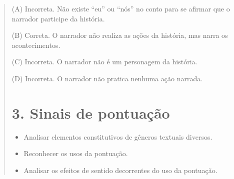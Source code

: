 \begin{quote}
(A) Incorreta. Não existe ``eu'' ou ``nós'' no conto para se afirmar
que o narrador participe da história.

(B) Correta. O narrador não realiza as ações da história, mas narra os
acontecimentos.

(C) Incorreta. O narrador não é um personagem da história.

(D) Incorreta. O narrador não pratica nenhuma ação narrada.

\section{3. Sinais de pontuação}\label{muxf3dulo-3}



\begin{itemize}
  \item Analisar elementos constitutivos de gêneros textuais diversos.
  \item Reconhecer os usos da pontuação.
  \item Analisar os efeitos de sentido decorrentes do uso da pontuação.
\end{itemize}


\end{quote}
